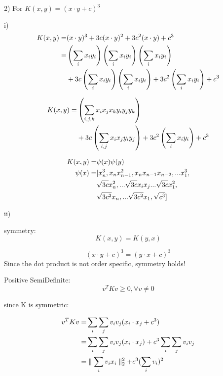 \documentclass[12pt]{article}
\begin{document}
\pagebreak
\setcounter{equation}{0}
2) For $K(x,y) = (x\cdot y + c)^3$

i)  
\begin{align}
   K(x,y) =& (x \cdot y)^3  + 3c(x \cdot y)^2 + 3c^2(x \cdot y) + c^3 \notag \\
   =& \left(\sum_i x_iy_i\right)\left(\sum_i x_iy_i\right)\left(\sum_i x_iy_i\right) \notag \\
   &+ 3c\left(\sum_i x_iy_i\right)\left(\sum_i x_iy_i\right) + 3c^2\left(\sum_i x_iy_i\right) + c^3
\end{align}

\begin{align}
   K(x,y) =& \left(\sum_{i,j,k} x_ix_jx_ky_iy_jy_k\right) \notag \\
   &+ 3c\left(\sum_{i,j} x_ix_jy_iy_j\right) + 3c^2\left(\sum_i x_iy_i\right) + c^3
\end{align}

\begin{align}
    K(x,y) =& \psi(x)\psi(y) \notag \\
    \psi(x) =& [x_n^3,x_nx_{n-1}^2,x_nx_{n-1}x_{n-2},...x_1^3, \notag \\
    &\sqrt{3c}x_n^2,...\sqrt{3c}x_ix_j...\sqrt{3c}x_1^2, \notag \\
    &\sqrt{3c^2}x_n,...\sqrt{3c^2}x_1,\sqrt{c^3}]
\end{align}

ii)

symmetry: 
\begin{equation}
    K(x,y) = K(y,x) 
\end{equation}

\begin{equation}
    (x\cdot y + c)^3 = (y\cdot x + c)^3
\end{equation}
Since the dot product is not order specific, symmetry holds! 

Positive SemiDefinite: 
\begin{equation}
    v^T K v \geq 0, \forall v\neq 0
\end{equation}

since K is symmetric: 

\begin{align}
    v^T K v =& \sum_i \sum_j v_i v_j (x_i \cdot x_j + c^3)  \notag \\
    =& \sum_i \sum_j v_i v_j (x_i \cdot x_j) + c^3\sum_i \sum_j v_i v_j  \notag \\
    =& \parallel\sum_i v_ix_i\parallel_2^2 + c^3(\sum_i v_i) ^2 
\end{align}
\end{document}

